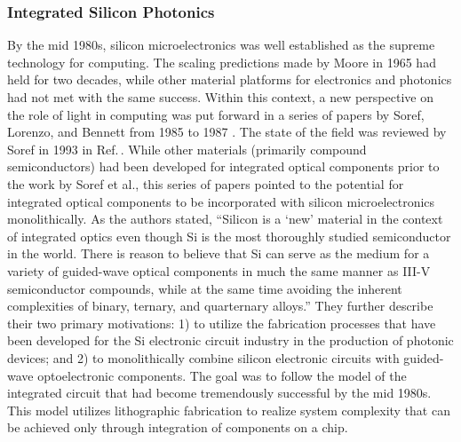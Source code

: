 
\subsubsection{\label{sec:integrated_silicon_photonics}Integrated Silicon Photonics}
By the mid 1980s, silicon microelectronics was well established as the supreme technology for computing. The scaling predictions made by Moore in 1965 \cite{mo1965} had held for two decades, while other material platforms for electronics and photonics had not met with the same success. Within this context, a new perspective on the role of light in computing was put forward in a series of papers by Soref, Lorenzo, and Bennett from 1985 to 1987 \cite{sole1985,sole1986,sobe1987}. The state of the field was reviewed by Soref in 1993 in Ref.\,\cite{so1993}. While other materials (primarily compound semiconductors) had been developed for integrated optical components prior to the work by Soref et al., this series of papers pointed to the potential for integrated optical components to be incorporated with silicon microelectronics monolithically. As the authors stated, ``Silicon is a `new' material in the context of integrated optics even though Si is the most thoroughly studied semiconductor in the world. There is reason to believe that Si can serve as the medium for a variety of guided-wave optical components in much the same manner as III-V semiconductor compounds, while at the same time avoiding the inherent complexities of binary, ternary, and quarternary alloys.'' \cite{sole1986} They further describe their two primary motivations: 1) to utilize the fabrication processes that have been developed for the Si electronic circuit industry in the production of photonic devices; and 2) to monolithically combine silicon electronic circuits with guided-wave optoelectronic components. The goal was to follow the model of the integrated circuit that had become tremendously successful by the mid 1980s. This model utilizes lithographic fabrication to realize system complexity that can be achieved only through integration of components on a chip.

